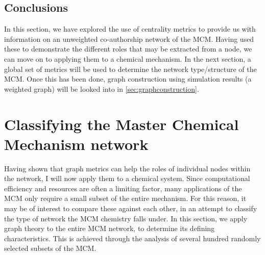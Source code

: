 \subsection{Conclusions}
In this section, we have explored the use of centrality metrics to provide us with information on an unweighted co-authorship network of the MCM. Having used these to demonstrate the different roles that may be extracted from a node, we can move on to applying them to a chemical mechanism. In the next section, a global set of metrics will be used to determine the network type/structure of the MCM. Once this has been done, graph construction using simulation results (a weighted graph) will be looked into in \autoref{sec:graphconstruction}. 
% 
% 
% 
% 


\section{Classifying the Master Chemical Mechanism network}

Having shown that graph metrics can help the roles of individual nodes within the network, I will now apply them to a chemical system. Since computational efficiency and resources are often a limiting factor, many applications of the MCM only require a small subset of the entire mechanism. For this reason, it may be of interest to compare these against each other, in an attempt to classify the type of network the MCM chemistry falls under. In this section, we apply graph theory to the entire MCM network, to determine its defining characteristics. This is achieved through the analysis of several hundred randomly selected subsets of the MCM. 

